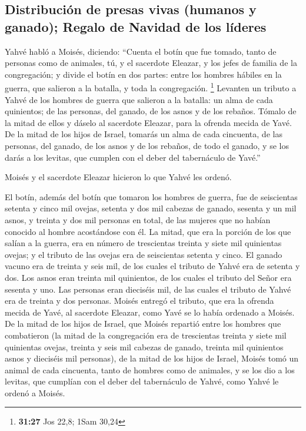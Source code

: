 \hypertarget{distribuciuxf3n-de-presas-vivas-humanos-y-ganado-regalo-de-navidad-de-los-luxedderes}{%
\subsection{Distribución de presas vivas (humanos y ganado); Regalo de
Navidad de los
líderes}\label{distribuciuxf3n-de-presas-vivas-humanos-y-ganado-regalo-de-navidad-de-los-luxedderes}}

 Yahvé habló a Moisés, diciendo:  ``Cuenta
el botín que fue tomado, tanto de personas como de animales, tú, y el
sacerdote Eleazar, y los jefes de familia de la congregación;
 y divide el botín en dos partes: entre los hombres
hábiles en la guerra, que salieron a la batalla, y toda la congregación.
\footnote{\textbf{31:27} Jos 22,8; 1Sam 30,24}  Levanten
un tributo a Yahvé de los hombres de guerra que salieron a la batalla:
un alma de cada quinientos; de las personas, del ganado, de los asnos y
de los rebaños.  Tómalo de la mitad de ellos y dáselo al
sacerdote Eleazar, para la ofrenda mecida de Yavé.  De la
mitad de los hijos de Israel, tomarás un alma de cada cincuenta, de las
personas, del ganado, de los asnos y de los rebaños, de todo el ganado,
y se los darás a los levitas, que cumplen con el deber del tabernáculo
de Yavé.''

 Moisés y el sacerdote Eleazar hicieron lo que Yahvé les
ordenó.

 El botín, además del botín que tomaron los hombres de
guerra, fue de seiscientas setenta y cinco mil ovejas, 
setenta y dos mil cabezas de ganado,  sesenta y un mil
asnos,  y treinta y dos mil personas en total, de las
mujeres que no habían conocido al hombre acostándose con él.
 La mitad, que era la porción de los que salían a la
guerra, era en número de trescientas treinta y siete mil quinientas
ovejas;  y el tributo de las ovejas era de seiscientas
setenta y cinco.  El ganado vacuno era de treinta y seis
mil, de los cuales el tributo de Yahvé era de setenta y dos.
 Los asnos eran treinta mil quinientos, de los cuales el
tributo del Señor era sesenta y uno.  Las personas eran
dieciséis mil, de las cuales el tributo de Yahvé era de treinta y dos
personas.  Moisés entregó el tributo, que era la ofrenda
mecida de Yavé, al sacerdote Eleazar, como Yavé se lo había ordenado a
Moisés.  De la mitad de los hijos de Israel, que Moisés
repartió entre los hombres que combatieron  (la mitad de
la congregación era de trescientas treinta y siete mil quinientas
ovejas,  treinta y seis mil cabezas de ganado,
 treinta mil quinientos asnos  y dieciséis
mil personas),  de la mitad de los hijos de Israel,
Moisés tomó un animal de cada cincuenta, tanto de hombres como de
animales, y se los dio a los levitas, que cumplían con el deber del
tabernáculo de Yahvé, como Yahvé le ordenó a Moisés.


